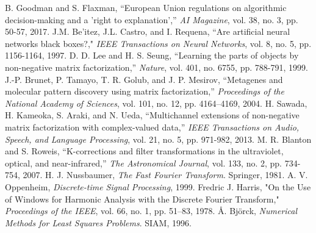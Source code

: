 \documentclass[lettersize,journal]{IEEEtran}
\begin{document}
\begin{thebibliography}{1}
B. Goodman and S. Flaxman, ``European Union regulations on algorithmic decision-making and a 'right to explanation','' \textit{AI Magazine}, vol. 38, no. 3, pp. 50-57, 2017.
J.M. Be{'{i}}tez, J.L. Castro, and I. Requena, ``Are artificial neural networks black boxes?," \textit{IEEE Transactions on Neural Networks}, vol. 8, no. 5, pp. 1156-1164, 1997.
D. D. Lee and H. S. Seung, ``Learning the parts of objects by non-negative matrix factorization,'' \textit{Nature}, vol. 401, no. 6755, pp. 788-791, 1999.
J.-P. Brunet, P. Tamayo, T. R. Golub, and J. P. Mesirov, ``Metagenes and molecular pattern discovery using matrix factorization,'' \textit{Proceedings of the National Academy of Sciences}, vol. 101, no. 12, pp. 4164--4169, 2004.
H. Sawada, H. Kameoka, S. Araki, and N. Ueda, ``Multichannel extensions of non-negative matrix factorization with complex-valued data,'' \textit{IEEE Transactions on Audio, Speech, and Language Processing}, vol. 21, no. 5, pp. 971-982, 2013.
M. R. Blanton and S. Roweis, ``K-corrections and filter transformations in the ultraviolet, optical, and near-infrared,'' \textit{The Astronomical Journal}, vol. 133, no. 2, pp. 734-754, 2007.
H. J. Nussbaumer, \emph{The Fast Fourier Transform}. Springer, 1981.
A. V. Oppenheim, \textit{Discrete-time Signal Processing}, 1999.
Fredric J. Harris, "On the Use of Windows for Harmonic Analysis with the Discrete Fourier Transform," \textit{Proceedings of the IEEE}, vol. 66, no. 1, pp. 51–83, 1978. 
Å. Björck, \textit{Numerical Methods for Least Squares Problems}. SIAM, 1996.


\end{thebibliography}
\end{document}
